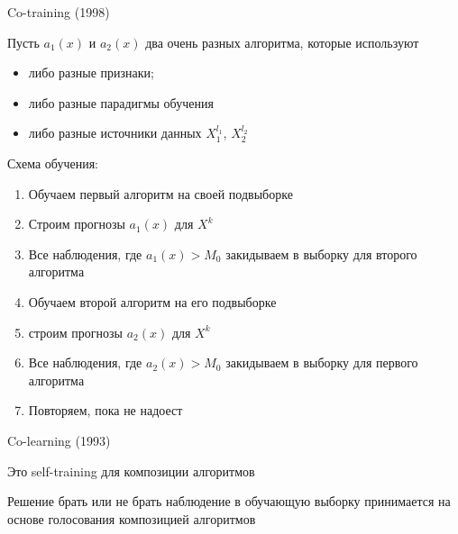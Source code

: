 \documentclass[notes,12pt, aspectratio=169]{beamer}
\newenvironment{wideitemize}{\itemize\addtolength{\itemsep}{10pt}}{\enditemize}
\begin{document}
\begin{frame}{Co-training (1998)}
\begin{wideitemize}
\item Пусть $a_1(x)$ и $a_2(x)$ два очень разных алгоритма, которые используют 

\begin{itemize} 
	\item  либо разные признаки;
	
	\item  либо разные парадигмы обучения
	
	\item либо разные источники данных  $X_1^{l_1}$, $X_2^{l_2}$
\end{itemize}

\item Схема обучения: 

\begin{enumerate}
	\item  Обучаем первый алгоритм на своей подвыборке

	\item Строим прогнозы $a_1(x)$ для $X^k$

	\item Все наблюдения, где $a_1(x) > M_0$ закидываем в выборку для второго алгоритма
		
	\item 	Обучаем второй алгоритм на его подвыборке 
	
	\item строим прогнозы $a_2(x)$ для $X^k$
	
	\item Все наблюдения, где $a_2(x) > M_0$ закидываем в выборку для первого алгоритма 
	
	\item Повторяем, пока не надоест
\end{enumerate}
\end{wideitemize}
\end{frame}


\begin{frame}{Co-learning (1993)}
\begin{wideitemize}
	\item Это self-training для композиции алгоритмов
	
	\item Решение брать или не брать наблюдение в обучающую выборку принимается на основе голосования композицией алгоритмов
\end{wideitemize}
\end{frame}
\end{document}
